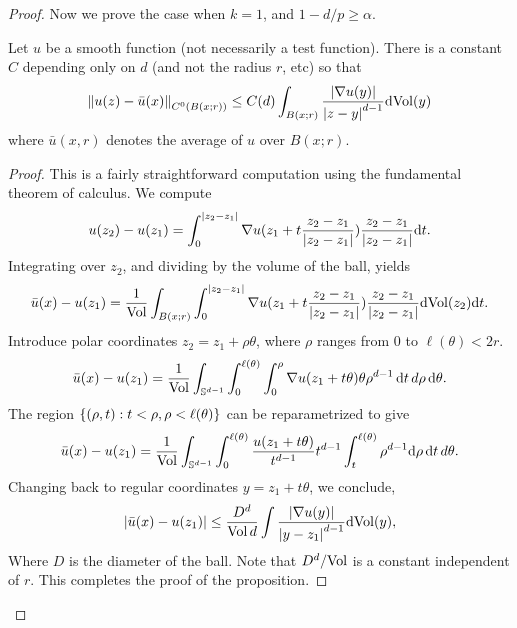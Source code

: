 \documentclass{amsart}
\begin{document}
\begin{proof}
  Now we prove the case when $k=1$, and $1-d/p\ge \alpha$.
  \begin{prop}
    Let $u$ be a smooth function (not necessarily a test function). There is a constant $C$ depending only on $d$ (and not the radius $r$, etc) so that
    \begin{equation*}
      \left\lVert u(z)-\bar{u}(x)\right\rVert_{C^{0}(B(x;r))}\le C(d)\int_{B(x;r)}\frac{\left|\nabla u(y)\right|}{\left|z-y\right|^{d-1}}\mathrm{dVol}(y)
    \end{equation*}
    where $\bar{u}(x,r)$ denotes the average of $u$ over $B(x;r)$.
  \end{prop}
  \begin{proof}
    This is a fairly straightforward computation using the fundamental theorem of calculus. We compute
    \begin{equation*}
      u(z_{2})-u(z_{1})=\int_{0}^{\left|z_{2}-z_{1}\right|}\nabla u(z_{1}+t\frac{z_{2}-z_{1}}{\left|z_{2}-z_{1}\right|})\frac{z_{2}-z_{1}}{\left|z_{2}-z_{1}\right|}\mathrm{d} t.
    \end{equation*}
    Integrating over $z_{2}$, and dividing by the volume of the ball, yields
    \begin{equation*}
      \bar{u}(x)-u(z_{1})=\frac{1}{\text{Vol}}\int_{B(x;r)}\int_{0}^{\left|z_{2}-z_{1}\right|}\nabla u(z_{1}+t\frac{z_{2}-z_{1}}{\left|z_{2}-z_{1}\right|})\frac{z_{2}-z_{1}}{\left|z_{2}-z_{1}\right|}\mathrm{d} \mathrm{Vol}(z_{2})\mathrm{d} t.
    \end{equation*}
    Introduce polar coordinates $z_{2}=z_{1}+\rho \theta$, where $\rho$ ranges from $0$ to $\ell(\theta)<2r$. 
    \begin{equation*}
      \bar{u}(x)-u(z_{1})=\frac{1}{\text{Vol}}\int_{\mathbb{S}^{d-1}}\int_{0}^{\ell(\theta)}\int_{0}^{\rho}\nabla u(z_{1}+t\theta)\theta \rho^{d-1}\,\mathrm{d} t\,d\rho\,\mathrm{d}\theta.
    \end{equation*}
    The region $\left\{(\rho,t):t<\rho, \rho<\ell(\theta)\right\}$ can be reparametrized to give
    \begin{equation*}
      \bar{u}(x)-u(z_{1})=\frac{1}{\text{Vol}}\int_{\mathbb{S}^{d-1}}\int_{0}^{\ell(\theta)}\frac{u(z_{1}+t\theta)}{t^{d-1}}t^{d-1}\int_{t}^{\ell(\theta)}\rho^{d-1}\mathrm{d}\rho\,\mathrm{d} t\,d\theta.
    \end{equation*}
    Changing back to regular coordinates $y=z_{1}+t\theta$, we conclude,
    \begin{equation*}
      \left|\bar{u}(x)-u(z_{1})\right|\le \frac{D^{d}}{\mathrm{Vol}\,d}\int\frac{\left|\nabla u(y)\right|}{\left|y-z_{1}\right|^{d-1}}\mathrm{d}\mathrm{Vol}(y),
    \end{equation*}
    Where $D$ is the diameter of the ball. Note that $D^{d}/\mathrm{Vol}$ is a constant independent of $r$. This completes the proof of the proposition.
  \end{proof}
  

\end{proof}
\end{document}
